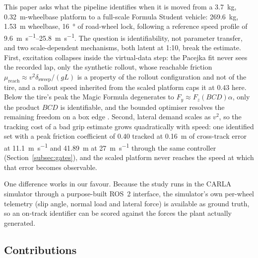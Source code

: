 This paper asks what the pipeline identifies when it is moved from a
\SI{3.7}{\kilo\gram}, \SI{0.32}{\meter}-wheelbase platform to a full-scale
Formula Student vehicle: \SI{269.6}{\kilo\gram}, \SI{1.53}{\meter} wheelbase,
\SI{16}{\degree} of road-wheel lock, following a reference speed profile of
\SIrange{9.6}{25.8}{\meter\per\second}. The question is identifiability, not
parameter transfer, and two scale-dependent mechanisms, both latent at 1:10,
break the estimate. First, excitation collapses inside the virtual-data
step: the Pacejka fit never sees the recorded lap, only the synthetic rollout,
whose reachable friction
$\mu_{\mathrm{reach}}\!\approx\!v^{2}\delta_{\mathrm{sweep}}/(gL)$ is a property
of the rollout configuration and not of the tire, and a rollout speed inherited
from the scaled platform caps it at $0.43$ here. Below the tire's peak the Magic
Formula degenerates to $F_{y}\approx F_{z}(BCD)\alpha$, only the product $BCD$
is identifiable, and the bounded optimiser resolves the remaining freedom on a
box edge \cite{ljung1999sysid,pacejka2012book}. Second, lateral demand
scales as $v^{2}$, so the tracking cost of a bad grip estimate grows
quadratically with speed:
one identified set with a peak friction coefficient of \num{0.40} tracked at
\SI{0.16}{\meter} of cross-track error at \SI{11.1}{\meter\per\second} and
\SI{41.89}{\meter} at \SI{27}{\meter\per\second} through the same controller
(Section~\ref{subsec:gates}), and the scaled platform never reaches the speed at
which that error becomes observable.

One difference works in our favour. Because the study runs in the CARLA
simulator \cite{carla2017} through a purpose-built ROS~2 interface, the
simulator's own per-wheel telemetry (slip angle, normal load and lateral force)
is available as ground truth, so an on-track identifier can be scored against
the forces the plant actually generated.

\subsection{Contributions}

